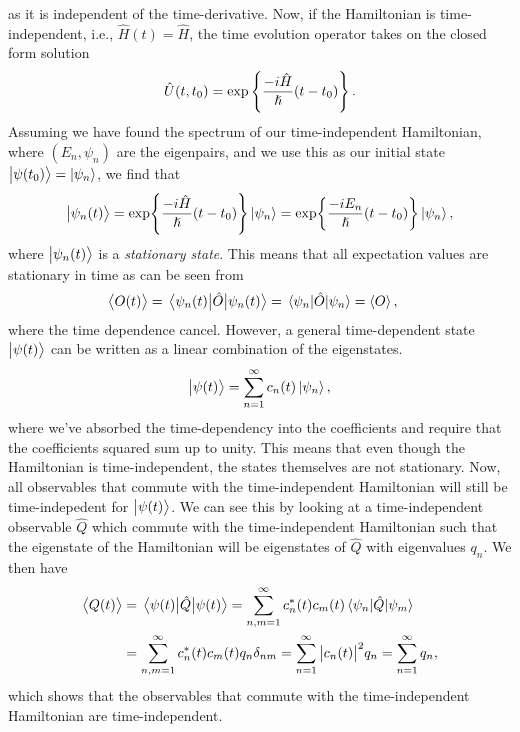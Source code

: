         as it is independent of the time-derivative.
        Now, if the Hamiltonian is time-independent, i.e., $\hat{H}(t) =
        \hat{H}$, the time evolution operator takes on the closed form solution
        \begin{align}
            \hat{U}(t, t_0) = \exp\left\{ 
                \frac{-i \hat{H}}{\hslash} (t - t_0)
             \right\}.
            \label{eq:ti-evolution}
        \end{align}
        Assuming we have found the spectrum of our time-independent Hamiltonian,
        where $(E_n, \psi_n)$ are the eigenpairs, and we use this as our initial
        state $\ket{\psi(t_0)} = \ket{\psi_n}$, we find that
        \begin{gather}
            \ket{\psi_n(t)}
            = \exp{\frac{-i\hat{H}}{\hslash}(t - t_0)}\ket{\psi_n}
            = \exp{\frac{-i E_n}{\hslash} (t - t_0)}\ket{\psi_n},
        \end{gather}
        where $\ket{\psi_n(t)}$ is a \emph{stationary state}.
        This means that all expectation values are stationary in time as can be
        seen from
        \begin{align}
            \expval{O(t)}
            &= \mel{\psi_n(t)}{\hat{O}}{\psi_n(t)}
            = \mel{\psi_n}{\hat{O}}{\psi_n}
            = \expval{O},
        \end{align}
        where the time dependence cancel.
        However, a general time-dependent state $\ket{\psi(t)}$ can be written
        as a linear combination of the eigenstates.
        \begin{align}
            \ket{\psi(t)} = \sum_{n = 1}^{\infty}c_n(t)\ket{\psi_n},
        \end{align}
        where we've absorbed the time-dependency into the coefficients and
        require that the coefficients squared sum up to unity.
        This means that even though the Hamiltonian is time-independent, the
        states themselves are not stationary.
        Now, all observables that commute with the time-independent Hamiltonian
        will still be time-indepedent for $\ket{\psi(t)}$.
        We can see this by looking at a time-independent observable $\hat{Q}$
        which commute with the time-independent Hamiltonian such that the
        eigenstate of the Hamiltonian will be eigenstates of $\hat{Q}$ with
        eigenvalues $q_n$.
        We then have
        \begin{align}
            \expval{Q(t)}
            &= \mel{\psi(t)}{\hat{Q}}{\psi(t)}
            = \sum_{n, m = 1}^{\infty} c^{*}_n(t) c_m(t)
            \mel{\psi_n}{\hat{Q}}{\psi_m}
            \\
            &= \sum_{n, m = 1}^{\infty}
            c^{*}_n(t) c_m(t) q_n \delta_{nm}
            = \sum_{n = 1}^{\infty}
            \abs{c_n(t)}^2 q_n
            = \sum_{n = 1}^{\infty}
            q_n,
        \end{align}
        which shows that the observables that commute with the time-independent
        Hamiltonian are time-independent.


